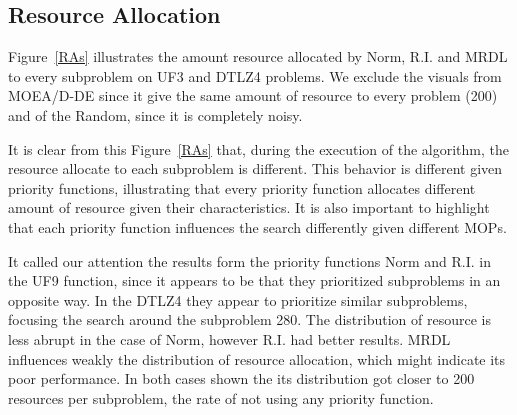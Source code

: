 \subsection{Resource Allocation}

Figure~\ref{RAs} illustrates the amount resource allocated by Norm, R.I. and MRDL to every subproblem on UF3 and DTLZ4 problems. We exclude the visuals from MOEA/D-DE since it give the same amount of resource to every problem (200) and of the Random, since it is completely noisy.

It is clear from this Figure~\ref{RAs} that, during the execution of the algorithm, the resource allocate to each subproblem is different. This behavior is different given priority functions, illustrating that every priority function allocates different amount of resource given their characteristics. It is also important to highlight that each priority function influences the search differently given different MOPs.

It called our attention the results form the priority functions Norm and R.I. in the UF9 function, since it appears to be that they prioritized subproblems in an opposite way. In the DTLZ4 they appear to prioritize similar subproblems, focusing the search around the subproblem 280. The distribution of resource is less abrupt in the case of Norm, however R.I. had better results. MRDL influences weakly the distribution of resource allocation, which might indicate its poor performance. In both cases shown the its distribution got closer to 200 resources per subproblem, the rate of not using any priority function.





